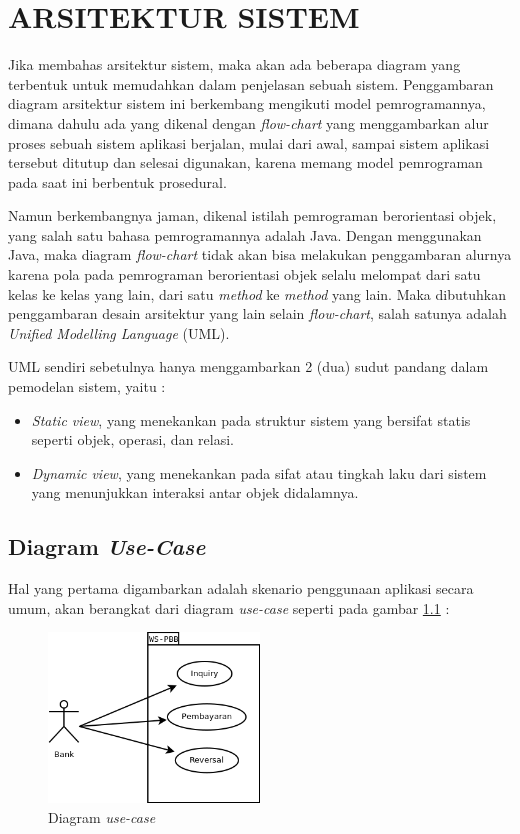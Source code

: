 \chapter{ARSITEKTUR SISTEM}

Jika membahas arsitektur sistem, maka akan ada beberapa diagram yang terbentuk untuk memudahkan dalam penjelasan sebuah sistem. Penggambaran diagram arsitektur sistem ini berkembang mengikuti model pemrogramannya, dimana dahulu ada yang dikenal dengan \textit{flow-chart} yang menggambarkan alur proses sebuah sistem aplikasi berjalan, mulai dari awal, sampai sistem aplikasi tersebut ditutup dan selesai digunakan, karena memang model pemrograman pada saat ini berbentuk prosedural. 

Namun berkembangnya jaman, dikenal istilah pemrograman berorientasi objek, yang salah satu bahasa pemrogramannya adalah Java. Dengan menggunakan Java, maka diagram \textit{flow-chart} tidak akan bisa melakukan penggambaran alurnya karena pola pada pemrograman berorientasi objek selalu melompat dari satu kelas ke kelas yang lain, dari satu \textit{method} ke \textit{method} yang lain. Maka dibutuhkan penggambaran desain arsitektur yang lain selain \textit{flow-chart}, salah satunya adalah \textit{Unified Modelling Language} (UML).

UML sendiri sebetulnya hanya menggambarkan 2 (dua) sudut pandang dalam pemodelan sistem, yaitu :

\begin{itemize}
  \item \textit{Static view}, yang menekankan pada struktur sistem yang bersifat statis seperti objek, operasi, dan relasi.
  
  \item \textit{Dynamic view}, yang menekankan pada sifat atau tingkah laku dari sistem yang menunjukkan interaksi antar objek didalamnya.
\end{itemize}

\section{Diagram \textit{Use-Case}}

Hal yang pertama digambarkan adalah skenario penggunaan aplikasi secara umum, akan berangkat dari diagram \textit{use-case} seperti pada gambar \ref{fig:uml-use-case} :

\begin{figure}[H]
  \centering
  \includegraphics[width=0.5\textwidth]{./resources/uml/uml-use-case}
  \caption{Diagram \textit{use-case}}
  \label{fig:uml-use-case}
\end{figure}

